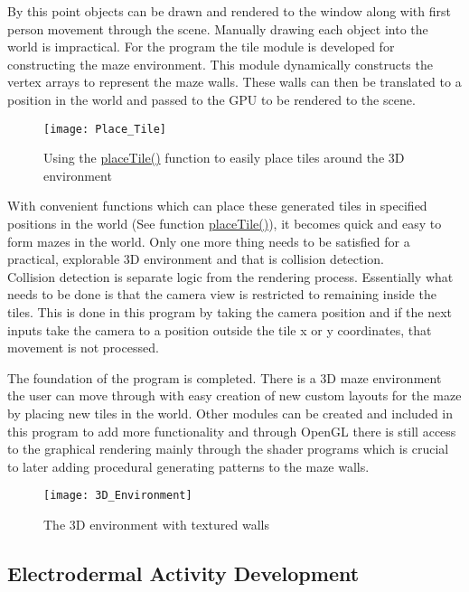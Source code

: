 \documentclass{report}
\begin{document}
By this point objects can be drawn and rendered to the window along with first person movement through the scene. Manually drawing each object into the world is impractical.
For the program the tile module is developed for constructing the maze environment. This module dynamically constructs the vertex arrays to represent the maze walls. These walls can
then be translated to a position in the world and passed to the GPU to be rendered to the scene.

\begin{figure}
\centerline{\texttt{[image: Place\_Tile]}}
\caption[Placing Generated Tiles]{}
\centerline{Using the \hyperlink{txt:pt}{placeTile()} function to easily place tiles around the 3D environment}
\end{figure}



With convenient functions which can place these generated tiles in specified positions in the world (See function \hyperlink{txt:pt}{placeTile()}), it 
becomes quick and easy to form mazes in the world.
Only one more thing needs to be satisfied for a practical, explorable 3D environment and that is collision detection.\\
Collision detection is separate logic from the rendering process. Essentially what needs to be done is that the camera view is restricted to remaining 
inside the tiles. This is done in this program by taking the camera position and if the next inputs take the camera to a position outside the tile x or y 
coordinates, that movement is not processed.

The foundation of the program is completed. There is a 3D maze environment the user can move through with easy creation of new custom layouts for the maze by
placing new tiles in the world. Other modules can be created and included in this program to add more functionality and through OpenGL there is still access
to the graphical rendering mainly through the shader programs which is crucial to later adding procedural generating patterns to the maze walls.

\begin{figure}
\centerline{\texttt{[image: 3D\_Environment]}}
\caption[3D Environment]{}
\centerline{The 3D environment with textured walls}
\end{figure}

\subsection{Electrodermal Activity Development}
\end{document}
